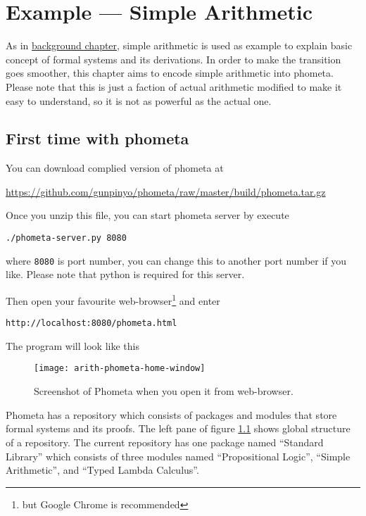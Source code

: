 \documentclass[master.tex]{subfiles}
\begin{document}
\chapter{Example --- Simple Arithmetic}
\label{chap:example_simple_arithmetic}

As in \hyperref[chap:background]{background chapter}, simple arithmetic is
used as example to explain basic concept of formal systems and its derivations.
In order to make the transition goes smoother, this chapter aims to encode
simple arithmetic into phometa. Please note that this is just a faction of
actual arithmetic modified to make it easy to understand, so it is not as
powerful as the actual one.

\section{First time with phometa}

You can download complied version of phometa at

{\centering\url{https://github.com/gunpinyo/phometa/raw/master/build/phometa.tar.gz}}

Once you unzip this file, you can start phometa server by execute

\texttt{./phometa-server.py 8080}

where \texttt{8080} is port number, you can change this to another port number
if you like. Please note that python is required for this server.

Then open your favourite web-browser\footnote{but Google Chrome is recommended}
and enter

\texttt{http://localhost:8080/phometa.html}

The program will look like this

\begin{figure}[H]
    \centering
    \texttt{[image: arith-phometa-home-window]}
    \caption{Screenshot of Phometa when you open it from web-browser.}
\label{fig:arith-phometa-home-window}
\end{figure}

Phometa has a repository which consists of packages and modules that store
formal systems and its proofs. The left pane of figure
\ref{fig:arith-phometa-home-window} shows global structure of a repository. The
current repository has one package named ``Standard Library'' which consists of
three modules named ``Propositional Logic'', ``Simple Arithmetic'', and ``Typed
Lambda Calculus''.
\end{document}
